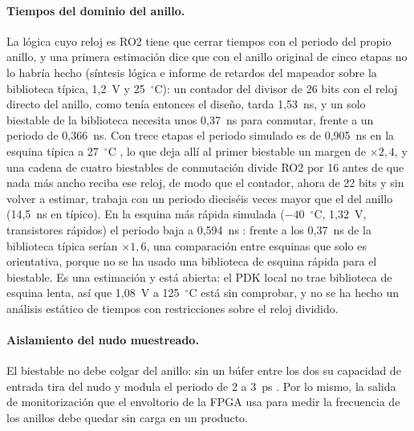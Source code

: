 \paragraph{Tiempos del dominio del anillo.} La lógica cuyo reloj es RO2
tiene que cerrar tiempos con el periodo del propio anillo, y una primera
estimación dice que con el anillo original de cinco etapas no lo habría
hecho \est{} (síntesis lógica e informe de retardos del mapeador sobre
la biblioteca típica, 1,2~V y 25~$^\circ$C): un contador del divisor de
26 bits con el reloj directo del anillo, como tenía entonces el diseño,
tarda 1,53~ns, y un solo biestable de la biblioteca necesita
unos 0,37~ns para conmutar, frente a un periodo de 0,366~ns. Con trece
etapas el periodo simulado es de 0,905~ns en la esquina típica a
27~$^\circ$C \simu{}, lo que deja allí al primer biestable un
margen de $\times2{,}4$, y una cadena de cuatro biestables de
conmutación divide RO2 por 16 antes de que nada más ancho reciba ese
reloj, de modo que el contador, ahora de 22 bits y sin volver a estimar,
trabaja con un periodo dieciséis veces mayor que el del anillo (14,5~ns
en típico). En la esquina más rápida simulada ($-40$~$^\circ$C, 1,32~V,
transistores rápidos) el periodo baja a 0,594~ns \simu{}: frente a los
0,37~ns de la biblioteca típica serían $\times1{,}6$, una comparación
entre esquinas que solo es orientativa, porque no se ha usado una
biblioteca de esquina rápida para el biestable. Es una estimación y está abierta: el \ac{PDK}
local no trae biblioteca de esquina lenta, así que 1,08~V a
125~$^\circ$C está sin comprobar, y no se ha hecho un análisis estático
de tiempos con restricciones sobre el reloj dividido.

\paragraph{Aislamiento del nudo muestreado.} El biestable no debe colgar
del anillo: sin un búfer entre los dos su capacidad de entrada tira del
nudo y modula el periodo de 2 a 3~ps \simu{}. Por lo mismo, la salida de
monitorización que el envoltorio de la \ac{FPGA} usa para medir la
frecuencia de los anillos debe quedar sin carga en un producto.

